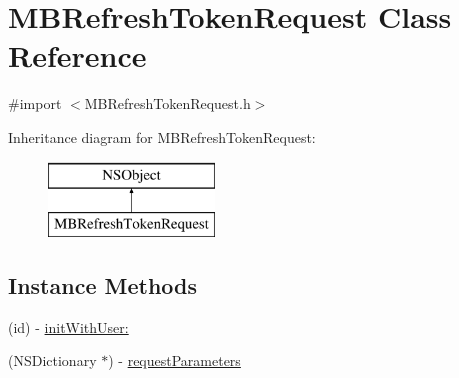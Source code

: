 \hypertarget{interface_m_b_refresh_token_request}{\section{M\-B\-Refresh\-Token\-Request Class Reference}
\label{interface_m_b_refresh_token_request}
}


{\ttfamily \#import $<$M\-B\-Refresh\-Token\-Request.\-h$>$}

Inheritance diagram for M\-B\-Refresh\-Token\-Request\-:\begin{figure}[H]
\begin{center}
\leavevmode
\includegraphics[height=2.000000cm]{interface_m_b_refresh_token_request}
\end{center}
\end{figure}
\subsection*{Instance Methods}
\begin{DoxyCompactItemize}
\item 
(id) -\/ \hyperlink{interface_m_b_refresh_token_request_a1c852f7b677ae2b465e87d499405c773}{init\-With\-User\-:}
\item 
(N\-S\-Dictionary $\ast$) -\/ \hyperlink{interface_m_b_refresh_token_request_a4d3c7a419dcb0f78e0ba7d834f70386f}{request\-Parameters}
\end{DoxyCompactItemize}


